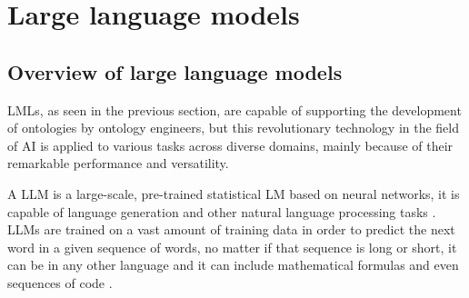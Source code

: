 \section{Large language models}
\label{section:2_3_llms}
\subsection{Overview of large language models}
LMLs, as seen in the previous section, are capable of supporting the development of ontologies by ontology engineers, but this revolutionary technology in the field of AI is applied to various tasks across diverse domains, mainly because of their remarkable performance and versatility.

A LLM is a large-scale, pre-trained statistical LM based on neural networks, it is capable of language generation and other natural language processing tasks \cite{llm_wiki}.
LLMs are trained on a vast amount of training data in order to predict the next word in a given sequence of words, no matter if that sequence is long or short, it can be in any other language and it can include mathematical formulas and even sequences of code \cite{llm_medium}.

